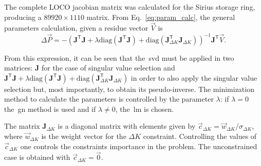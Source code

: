The complete LOCO jacobian matrix was calculated for the Sirius storage ring, producing a $89920 \times 1110$ matrix. From Eq.~\eqref{eq:param_calc}, the general parameters calculation, given a residue vector $\vec{V}$ is
\begin{equation*}
\Delta \vec{P} = - \left(\mathbf{J}^{\mathsf{T}}\mathbf{J} + \lambda \mathrm{diag}\left(\mathbf{J}^{\mathsf{T}}\mathbf{J}\right) + \mathrm{diag}\left(\mathbf{J}^{\mathsf{T}}_{\Delta K}\mathbf{J}_{\Delta K}\right) \right)^{-1}\mathbf{J}^{\mathsf{T}}\vec{V}.
\end{equation*}

From this expression, it can be seen that the~\gls{svd} must be applied in two matrices: $\mathbf{J}$ for the case of singular value selection and $\mathbf{J}^{\mathsf{T}}\mathbf{J} + \lambda \mathrm{diag}\left(\mathbf{J}^{\mathsf{T}}\mathbf{J}\right) + \mathrm{diag}\left(\mathbf{J}^{\mathsf{T}}_{\Delta K}\mathbf{J}_{\Delta K}\right)$ in order to also apply the singular value selection but, most importantly, to obtain its pseudo-inverse. The minimization method to calculate the parameters is controlled by the parameter $\lambda$: if $\lambda = 0$ the~\gls{gn} method is used and if $\lambda \neq 0$, the~\gls{lm} is chosen.

The matrix $\mathbf{J}_{\Delta K}$ is a diagonal matrix with elements given by $\vec{c}_{\Delta K} = \vec{w}_{\Delta K}/\sigma_{\Delta K}$, where $\vec{w}_{\Delta K}$ is the weight vector for the ${\Delta K}$ constraint. Controlling the values of $\vec{c}_{\Delta K}$ one controls the constraints importance in the problem. The unconstrained case is obtained with $\vec{c}_{\Delta K} = \vec{0}$.

